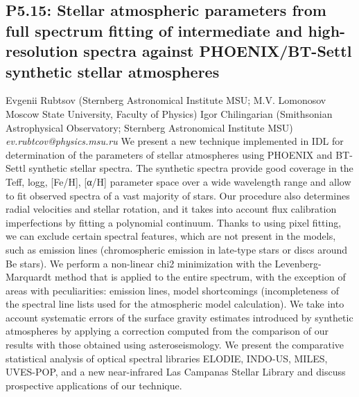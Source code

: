 \documentclass{report}
\begin{document}
\subsection*{P5.15: Stellar atmospheric parameters from full spectrum fitting of intermediate and high-resolution spectra against PHOENIX/BT-Settl synthetic stellar atmospheres}
\bigskip
Evgenii Rubtsov (Sternberg Astronomical Institute MSU; M.V. Lomonosov Moscow State University, Faculty of Physics) \newline Igor Chilingarian (Smithsonian Astrophysical Observatory; Sternberg Astronomical Institute MSU) \newline   \newline   \newline  \newline  \newline\newline
{\it ev.rubtcov@physics.msu.ru}\newline
\newline\newline
We present a new technique implemented in IDL for determination of the parameters of stellar atmospheres using PHOENIX and BT-Settl synthetic stellar spectra. The synthetic spectra provide good coverage in the Teff, logg, [Fe/H], [α/H] parameter space over a wide wavelength range and allow to fit observed spectra of a vast majority of stars. Our procedure also determines radial velocities and stellar rotation, and it takes into account flux calibration imperfections by fitting a polynomial continuum. Thanks to using pixel fitting, we can exclude certain spectral features, which are not present in the models, such as emission lines (chromospheric emission in late-type stars or discs around Be stars). We perform a non-linear chi2 minimization with the Levenberg-Marquardt method that is applied to the entire spectrum, with the exception of areas with peculiarities: emission lines, model shortcomings (incompleteness of the spectral line lists used for the atmospheric model calculation). We take into account systematic errors of the surface gravity estimates introduced by synthetic atmospheres by applying a correction computed from the comparison of our results with those obtained using asteroseismology. We present the comparative statistical analysis of optical spectral libraries ELODIE, INDO-US, MILES, UVES-POP, and a new near-infrared Las Campanas Stellar Library and discuss prospective applications of our technique.\newline
\newpage
\end{document}
